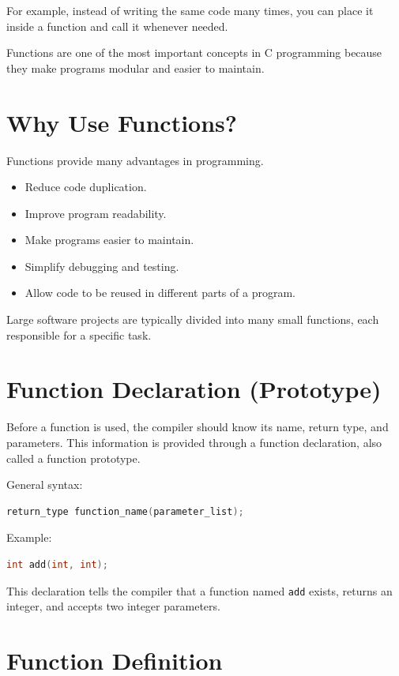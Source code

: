 \documentclass[12pt,openany]{book}
\begin{document}
For example, instead of writing the same code many times, you can place it inside a function and call it whenever needed.

Functions are one of the most important concepts in C programming because they make programs modular and easier to maintain.

\section{Why Use Functions?}

Functions provide many advantages in programming.

\begin{itemize}
    \item Reduce code duplication.
    \item Improve program readability.
    \item Make programs easier to maintain.
    \item Simplify debugging and testing.
    \item Allow code to be reused in different parts of a program.
\end{itemize}

Large software projects are typically divided into many small functions, each responsible for a specific task.

\section{Function Declaration (Prototype)}

Before a function is used, the compiler should know its name, return type, and parameters. This information is provided through a function declaration, also called a function prototype.

General syntax:

\begin{lstlisting}[language=C]
return_type function_name(parameter_list);
\end{lstlisting}

Example:

\begin{lstlisting}[language=C]
int add(int, int);
\end{lstlisting}

This declaration tells the compiler that a function named \texttt{add} exists, returns an integer, and accepts two integer parameters.

\section{Function Definition}
\end{document}
